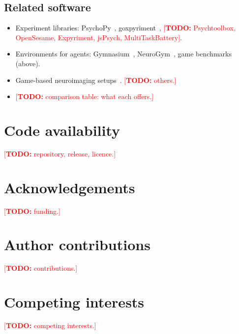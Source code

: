 \documentclass{article}
\newcommand{\TODO}[1]{\textcolor{red}{[\textbf{TODO:} #1]}}
\begin{document}
\subsection{Related software}
\begin{itemize}
  \item Experiment libraries: PsychoPy~\citep{peirce2019psychopy}, goxpyriment~\citep{pallier2026goxpyriment}, \TODO{Psychtoolbox, OpenSesame, Expyriment, jsPsych, MultiTaskBattery}.
  \item Environments for agents: Gymnasium~\citep{towers2024gymnasium}, NeuroGym~\citep{molanomazon2022neurogym}, game benchmarks (above).
  \item Game-based neuroimaging setups~\citep{boyle2025cneuromod}. \TODO{others.}
  \item \TODO{comparison table: what each offers.}
\end{itemize}

\section*{Code availability}
\TODO{repository, release, licence.}

\section*{Acknowledgements}
\TODO{funding.}

\section*{Author contributions}
\TODO{contributions.}

\section*{Competing interests}
\TODO{competing interests.}



\end{document}
